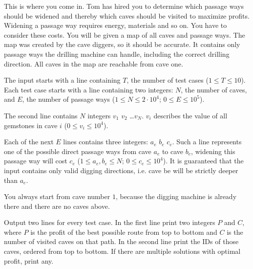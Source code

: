 This is where you come in.
Tom has hired you to determine which passage ways should be widened and thereby which caves should be visited to maximize profits.
Widening a passage way requires energy, materials and so on.
You have to consider these costs.
You will be given a map of all caves and passage ways.
The map was created by the cave diggers, so it should be accurate.
It contains only passage ways the drilling machine can handle, including the correct drilling direction.
All caves in the map are reachable from cave one.

\begin{Input}
    The input starts with a line containing $T$, the number of test cases ($1 \leq T \leq 10$).
    Each test case starts with a line containing two integers: $N$, the number of caves, and $E$, the number of passage ways ($1 \leq N \leq 2 \cdot 10^4$; $0 \leq E \leq 10^5$).
    
    The second line contains $N$ integers $v_1$ $v_2$ \dots $v_N$. $v_i$ describes the value of all gemstones in cave $i$ ($0 \leq v_i \leq 10^4$).
    
    Each of the next $E$ lines contains three integers: $a_e$ $b_e$ $c_e$.
    Such a line represents one of the possible direct passage ways from cave $a_e$ to cave $b_e$, widening this passage way will cost $c_e$ ($1 \leq a_e, b_e \leq N$; $0 \leq c_e \leq 10^4$).
    It is guaranteed that the input contains only valid digging directions, i.e. cave be will be strictly deeper than $a_e$.
    
    You always start from cave number $1$, because the digging machine is already there and there are no caves above.
\end{Input}

\begin{Output}
    Output two lines for every test case.
    In the first line print two integers $P$ and $C$, where $P$ is the profit of the best possible route from top to bottom and $C$ is the number of visited caves on that path.
    In the second line print the IDs of those caves, ordered from top to bottom.
    If there are multiple solutions with optimal profit, print any.
\end{Output}

